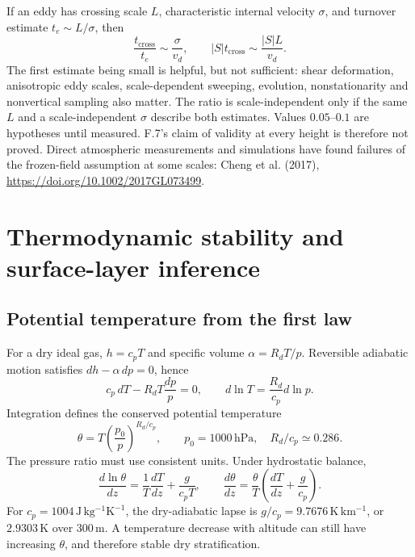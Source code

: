 If an eddy has crossing scale $L$, characteristic internal velocity
$\sigma$, and turnover estimate $t_e\sim L/\sigma$, then
\begin{equation}
 \frac{t_{\mathrm{cross}}}{t_e}\sim\frac{\sigma}{v_d},\qquad
 |S|t_{\mathrm{cross}}\sim\frac{|S|L}{v_d}.
\end{equation}
The first estimate being small is helpful, but not sufficient: shear
deformation, anisotropic eddy scales, scale-dependent sweeping, evolution,
nonstationarity and nonvertical sampling also matter. The ratio is
scale-independent only if the same $L$ and a scale-independent $\sigma$
describe both estimates. Values $0.05$--$0.1$ are hypotheses until measured.
F.7's claim of validity at every height is therefore not proved.
Direct atmospheric measurements and simulations have found failures of the
frozen-field assumption at some scales: Cheng et al. (2017),
\url{https://doi.org/10.1002/2017GL073499}.

\section{Thermodynamic stability and surface-layer inference}
\label{sec:boundary}

\subsection{Potential temperature from the first law}

For a dry ideal gas, $h=c_pT$ and specific volume $\alpha=R_dT/p$.
Reversible adiabatic motion satisfies $dh-\alpha\,dp=0$, hence
\begin{equation}
 c_p\,dT-R_dT\frac{dp}{p}=0,
 \qquad d\ln T=\frac{R_d}{c_p}d\ln p.
\end{equation}
Integration defines the conserved potential temperature
\begin{equation}
 \theta=T\left(\frac{p_0}{p}\right)^{R_d/c_p},
 \qquad p_0=1000\,\mathrm{hPa},\quad R_d/c_p\simeq0.286.
\end{equation}
The pressure ratio must use consistent units. Under hydrostatic balance,
\begin{equation}
 \frac{d\ln\theta}{dz}
 =\frac{1}{T}\frac{dT}{dz}+\frac{g}{c_pT},
 \qquad
 \frac{d\theta}{dz}=\frac{\theta}{T}
                    \left(\frac{dT}{dz}+\frac{g}{c_p}\right).
\end{equation}
For $c_p=1004\,\mathrm{J\,kg^{-1}K^{-1}}$, the dry-adiabatic lapse
is $g/c_p=9.7676\,\mathrm{K\,km^{-1}}$, or $2.9303\,\mathrm K$
over $300\,\mathrm m$. A temperature decrease with altitude can still
have increasing $\theta$, and therefore stable dry stratification.

